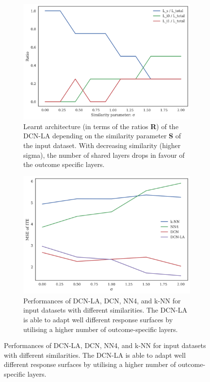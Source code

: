\begin{figure}[h]
	\centering
		\caption{A caption for both images}\label{fig:syn-sigma}
	\begin{subfigure}{\linewidth}
		\centering
		\includegraphics[width=.8\linewidth]{figures/chapter-5/syn-ratio-sigma.png}
		\caption{Learnt architecture (in terms of the ratios \textbf{R}) of the DCN-LA depending on the similarity parameter \textbf{S} of the input dataset. With decreasing similarity (higher sigma), the number of shared layers drops in favour of the outcome specific layers.}\label{fig:syn-sigma-ratios}
	\end{subfigure}
	\begin{subfigure}{\linewidth}
		\centering
		\includegraphics[width=.8\linewidth]{figures/chapter-5/syn-mse-sigma.png}
		\caption{Performances of DCN-LA, DCN, NN4, and k-NN for input datasets with different similarities. The DCN-LA is able to adapt well different response surfaces by utilising a higher number of outcome-specific layers. }\label{fig:syn-sigma-mse}
	\end{subfigure}  
 
\end{figure}  

